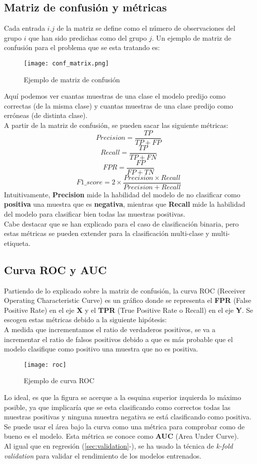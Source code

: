 \subsection{Matriz de confusión y métricas}
Cada entrada $i.j$ de la matriz se define como el número de observaciones del grupo $i$ que han sido predichas como del grupo $j$. Un ejemplo de matriz de confusión para el problema que se esta tratando es:
\begin{figure}[H]
	\centering
	\texttt{[image: conf\_matrix.png]}
	\caption{Ejemplo de matriz de confusión}
	\label{fig:conf_matrix}
\end{figure}
Aquí podemos ver cuantas muestras de una clase el modelo predijo como correctas (de la misma clase) y cuantas muestras de una clase predijo como erróneas (de distinta clase).\\
\linebreak
A partir de la matriz de confusión, se pueden sacar las siguiente métricas:
\[Precision = \frac{TP} {TP + FP}\]
\[Recall = \frac{TP}{TP + FN}\]
\[FPR = \frac{FP}{FP + TN}\]
\[ F1\_score = 2 \times \frac{Precision \times Recall}{Precision + Recall} \]
Intuitivamente, \textbf{Precision} mide la habilidad del modelo de no clasificar como \textbf{positiva} una muestra que es \textbf{negativa}, mientras que \textbf{Recall} mide la habilidad del modelo para clasificar bien todas las muestras positivas.\\
\linebreak
Cabe destacar que se han explicado para el caso de clasificación binaria, pero estas métricas se pueden extender para la clasificación multi-clase y multi-etiqueta.
\subsection{Curva ROC y AUC}
Partiendo de lo explicado sobre la matriz de confusión, la curva ROC (Receiver Operating Characteristic Curve) es un gráfico donde se representa el \textbf{FPR} (False Positive Rate) en el eje \textbf{X} y el \textbf{TPR} (True Positive Rate o Recall) en el eje \textbf{Y}. Se escogen estas métricas debido a la siguiente hipótesis:\\
A medida que incrementamos el ratio de verdaderos positivos, se va a incrementar el ratio de falsos positivos debido a que es más probable que el modelo clasifique como positivo una muestra que no es positiva.
\begin{figure}[H]
	\centering
	\texttt{[image: roc]}
	\caption{Ejemplo de curva ROC}
	\label{fig:roc}
\end{figure}
Lo ideal, es que la figura se acerque a la esquina superior izquierda lo máximo posible, ya que implicaría que se esta clasificando como correctos todas las muestras positivas y ninguna muestra negativa se está clasificando como positiva.\\
Se puede usar el área bajo la curva como una métrica para comprobar como de bueno es el modelo. Esta métrica se conoce como \textbf{AUC} (Area Under Curve).\\
\linebreak
Al igual que en regresión (\ref{sec:validation}-), se ha usado la técnica de \textit{k-fold validation} para validar el rendimiento de los modelos entrenados.
